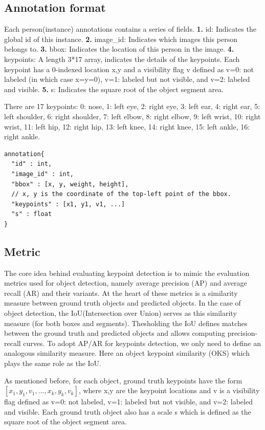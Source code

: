 \subsection{Annotation format}

Each person(instance) annotations contains a series of fields. \textbf{1.} id: Indicates the global id of this instance. \textbf{2.} image\_id: Indicates which images this person belongs to. \textbf{3.} bbox: Indicates the location of this person in the image.
\textbf{4.} keypoints: A length 3*17 array, indicates the details of the keypoints. Each keypoint has a 0-indexed location x,y and a visibility flag v defined as v=0: not labeled (in which case x=y=0), v=1: labeled but not visible, and v=2: labeled and visible.
\textbf{5.} s: Indicates the square root of the object segment area.

There are 17 keypoints: 0: nose, 1: left eye, 2: right eye, 3: left ear, 4: right ear, 5: left shoulder, 6: right shoulder, 7: left elbow, 8: right elbow, 9: left wrist, 10: right wrist, 11: left hip, 12: right hip, 13: left knee, 14: right knee, 15: left ankle, 16: right ankle.

\begin{lstlisting}
annotation{
  "id" : int,
  "image_id" : int,
  "bbox" : [x, y, weight, height],
  // x, y is the coordinate of the top-left point of the bbox.
  "keypoints" : [x1, y1, v1, ...]
  "s" : float
}
\end{lstlisting}

\subsection{Metric}

The core idea behind evaluating keypoint detection is to mimic the evaluation metrics used for object detection, namely average precision (AP) and average recall (AR) and their variants.
At the heart of these metrics is a similarity measure between ground truth objects and predicted objects.
In the case of object detection, the IoU(Intersection over Union) serves as this similarity measure (for both boxes and segments).
Thesholding the IoU defines matches between the ground truth and predicted objects and allows computing precision-recall curves.
To adopt AP/AR for keypoints detection, we only need to define an analogous similarity measure.
Here an object keypoint similarity (OKS) which plays the same role as the IoU.

As mentioned before, for each object, ground truth keypoints have the form $[x_{1},y_{1},v_{1},...,x_{k},y_{k},v_{k}]$, where x,y are the keypoint locations and v is a visibility flag defined as v=0: not labeled, v=1: labeled but not visible, and v=2: labeled and visible.
Each ground truth object also has a scale s which is defined as the square root of the object segment area.

